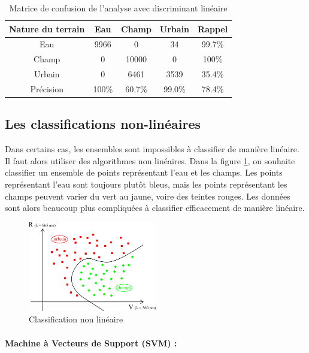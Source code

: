 \documentclass[a4paper,10pt]{report}
\begin{document}
\begin{table}[H]
\begin{center}
 \begin{tabular}{|c|c|c|c|c|}
  \hline
  Nature du terrain & Eau & Champ & Urbain & Rappel \\
  \hline
Eau & 9966  &   0  &      34 & 99.7\% \\
Champ & 0  &  10000   &     0 & 100\% \\
Urbain &  0    &    6461  &   3539   &     35.4\% \\
Précision & 100\% & 60.7\%  &      99.0\% & {\color{red}78.4\%}\\
  \hline
\end{tabular}
\end{center}
\caption{Matrice de confusion de l'analyse avec discriminant linéaire }
\label{table:veniseLDA}
\end{table}
    
     

\subsection{Les classifications non-linéaires}

Dans certains cas, les ensembles sont impossibles à classifier de manière linéaire. Il faut alors utiliser des algorithmes non linéaires. Dans la figure \ref{fig:ml_nlin}, on souhaite classifier un ensemble de points représentant l'eau et les champs. Les points représentant l'eau sont toujours plutôt bleus, mais les points représentant les champs peuvent varier du vert au jaune, voire des teintes rouges. Les données sont alors beaucoup plus compliquées à classifier efficacement de manière linéaire. 

\begin{figure}[H]
  \centering
    \includegraphics[width=0.5\textwidth]{ml_nlin}
  \caption{Classification non linéaire}
  \label{fig:ml_nlin}
\end{figure}

\paragraph{Machine à Vecteurs de Support (SVM) :}
\end{document}
